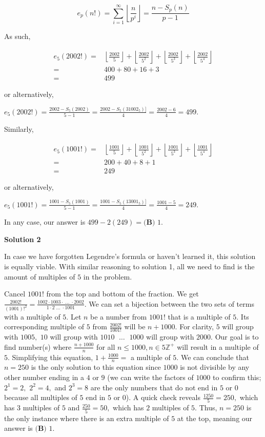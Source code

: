 \begin{enumerate}
 
 \[e_p(n!)=\sum_{i=1}^{\infty} \left\lfloor \dfrac{n}{p^i}\right\rfloor =\frac{n-S_{p}(n)}{p-1}\]

 As such,

 \begin{align*}e_5(2002!)=&\left\lfloor\frac{2002}{5}\right\rfloor+\left\lfloor\frac{2002}{5^2}\right\rfloor+\left\lfloor\frac {2002}{5^3}\right\rfloor+\left\lfloor\frac{2002}{5^4}\right\rfloor\\=&400+80+16+3 \\=&499\end{align*}


 or alternatively,

 $e_5(2002!)=\frac{2002-S_5(2002)}{5-1}=\frac{2002-S_5(31002_5)]}{4}=\frac{2002-6}{4}=499.$

 Similarly, 

 \begin{align*}e_5(1001!)=&\left\lfloor\frac{1001}{5}\right\rfloor+\left\lfloor\frac{1001}{5^2}\right\rfloor+\left\lfloor\frac {1001}{5^3}\right\rfloor+\left\lfloor\frac{1001}{5^4}\right\rfloor\\=&200+40+8+1 \\=&249\end{align*}


 or alternatively,

 $e_5(1001!)=\frac{1001-S_5(1001)}{5-1}=\frac{1001-S_5(13001_5)]}{4}=\frac{1001-5}{4}=249.$

 In any case, our answer is $499-2(249)= \boxed{\textbf{(B) } 1}.$




\textbf{Solution 2}

In case we have forgotten Legendre's formula or haven't learned it, this solution is equally viable. With similar reasoning to solution 1, all we need to find is the amount of multiples of $5$ in the problem.

 Cancel $1001!$ from the top and bottom of the fraction. We get $\frac{2002!}{(1001)!^2}=\frac{1002 \cdot 1003 \cdot \; \dots \; \cdot 2002}{1 \cdot 2 \; \dots \; \cdot 1001}.$ We can set a bijection between the two sets of terms with a multiple of $5.$ Let $n$ be a number from $1001!$ that is a multiple of $5.$ Its corresponding multiple of $5$ from $\frac{2002!}{1001!}$ will be $n+1000.$ For clarity, $5$ will group with $1005,$ $10$ will group with $1010$ $\; \dots \;$ $1000$ will group with $2000.$ Our goal is to find number(s) where $\frac{n+1000}{n}$ for all $n \leq 1000, n \in 5\mathbb{Z}^{+}$ will result in a multiple of $5.$ Simplifying this equation, $1+\frac{1000}{n}=$ a multiple of $5.$ We can conclude that $n=250$ is the only solution to this equation since $1000$ is not divisible by any other number ending in a $4$ or $9$ (we can write the factors of $1000$ to confirm this; $2^1=2,$ $2^2=4,$ and $2^3=8$ are the only numbers that do not end in $5$ or $0$ because all multiples of $5$ end in $5$ or $0$). A quick check reveals $\frac{1250}{5}=250,$ which has $3$ multiples of $5$ and $\frac{250}{5}=50,$ which has $2$ multiples of $5.$ Thus, $n=250$ is the only instance where there is an extra multiple of $5$ at the top, meaning our answer is $\boxed{\textbf{(B) } 1}.$


\end{enumerate}
